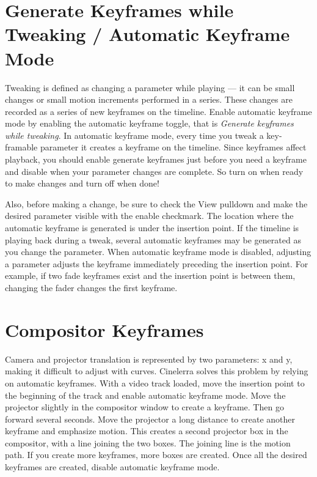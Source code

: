 {\section{Generate Keyframes while Tweaking / Automatic Keyframe Mode}%
\label{sec:generate_keyframe_tweaking}

Tweaking is defined as changing a parameter while playing --- it can be small changes or small motion increments performed in a series.  These changes are recorded as a series of new keyframes on the timeline.  Enable automatic keyframe mode by enabling the automatic keyframe toggle, that is \textit{Generate keyframes while tweaking}.  In automatic keyframe mode, every time you tweak a key-framable parameter it creates a keyframe on the timeline.  Since keyframes affect playback, you should enable generate keyframes just before you need a keyframe and disable when your parameter changes are complete.  So turn on when ready to make changes and turn off when done!

Also, before making a change, be sure to check the View pulldown and make the desired parameter visible with the enable checkmark.  The location where the automatic keyframe is generated is under the insertion point.  If the timeline is playing back during a tweak, several automatic keyframes may be generated as you change the parameter.  When automatic keyframe mode is disabled, adjusting a parameter adjusts the keyframe immediately preceding the insertion point.  For example, if two fade keyframes exist and the insertion point is between them, changing the fader changes the first keyframe.

\section{Compositor Keyframes}%
\label{sec:compositor_keyframes}

Camera and projector translation is represented by two parameters: x and y, making it difficult to adjust with curves.  Cinelerra solves this problem by relying on automatic keyframes.  With a video track loaded, move the insertion point to the beginning of the track and enable automatic keyframe mode.  Move the projector slightly in the compositor window to create a keyframe.  Then go forward several seconds.  Move the projector a long distance to create another keyframe and emphasize motion.  This creates a second projector box in the compositor, with a line joining the two boxes. The joining line is the motion path.  If you create more keyframes, more boxes are created.  Once all the desired keyframes are created, disable automatic keyframe mode.

}
